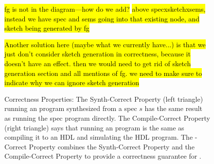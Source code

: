 
\begin{figure}
\small
{}
\caption{
  \lr Correctness Properties:
  {\small 
  The Synth-Correct Property (left triangle)
    running an \lrir program
    synthesized from a spec $s$
    has the same result
    as running the spec program directly.
  The Compile-Correct Property (right triangle)
    says that
    running an \lrir program
    is the same as compiling it to an HDL
    and simulating the HDL program.
The \lr-Correct Property
  combines the Synth-Correct Property
  and the Compile-Correct Property
  to provide a correctness guarantee for \lr.}}
\label{fig:correctness-comm-diagram}
\hl{fg is not in the diagram---how do we add?}
\hl{above specxsketchxsems, instead we have spec and sems going into that existing node, and sketch being generated by fg}


\hl{Another solution here (maybe what we currently have...) is that we just don't consider sketch generation in correctness, because it doesn't have an effect. then we would need to get rid of sketch generation section and all mentions of fg. we need to make sure to indicate why we can ignore sketch generation}
\end{figure}